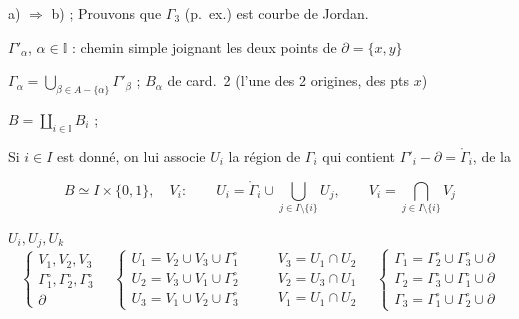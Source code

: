 \documentclass[11pt,a4paper]{article}
\begin{document}
a) $\Rightarrow$ b) ; Prouvons que $\Gamma_3$ (p.\ ex.) est courbe de
Jordan.


$\Gamma'_\alpha$, $\alpha \in \mathbb{I}$  \ill{}
\ill{} : chemin simple joignant les deux points de $\partial = \{x, y\}$

$\Gamma_\alpha = \bigcup_{\beta \in A - \{\alpha\}} \Gamma'_\beta$ ;
 \ill{} \ill{} $B_\alpha$ de card.\ 2 (l'une des 2
origines, des pts $x$)

$B = \coprod_{i \in \mathbb{I}} B_i$ ; 

Si $i \in I$ est donné, on lui associe $U_i$ la région de $\Gamma_i$ qui
contient $\Gamma'_i - \partial = \mathring{\Gamma}_i$, 
\ill{} \ill{} de la \ill{}

\[
B \simeq I \times \{0, 1\}, \quad V_i :
\qquad
U_i = \mathring{\Gamma}_i \cup \bigcup_{j \in I \setminus \{i\}} U_j,
\qquad
V_i = \bigcap_{j \in I \setminus \{i\}} V_j
\]

$U_i, U_j, U_k$
\[
\left\{
\begin{array}{l}
V_1, V_2, V_3 \\
\Gamma^{\circ}_1, \Gamma^{\circ}_2, \Gamma^{\circ}_3 \\
\partial
\end{array}
\right.
\quad
\left\{
\begin{array}{l}
U_1 = V_2 \cup V_3 \cup \Gamma^{\circ}_1 \\
U_2 = V_3 \cup V_1 \cup \Gamma^{\circ}_2 \\
U_3 = V_1 \cup V_2 \cup \Gamma^{\circ}_3
\end{array}
\right.
\qquad
\begin{array}{l}
V_3 = U_1 \cap U_2 \\
V_2 = U_3 \cap U_1 \\
V_1 = U_1 \cap U_2
\end{array}
\quad
\left\{
\begin{array}{l}
\Gamma_1 = \Gamma^{\circ}_2 \cup \Gamma^{\circ}_3 \cup \partial \\
\Gamma_2 = \Gamma^{\circ}_3 \cup \Gamma^{\circ}_1 \cup \partial \\
\Gamma_3 = \Gamma^{\circ}_1 \cup \Gamma^{\circ}_2 \cup \partial
\end{array}
\right.
\]
\end{document}
